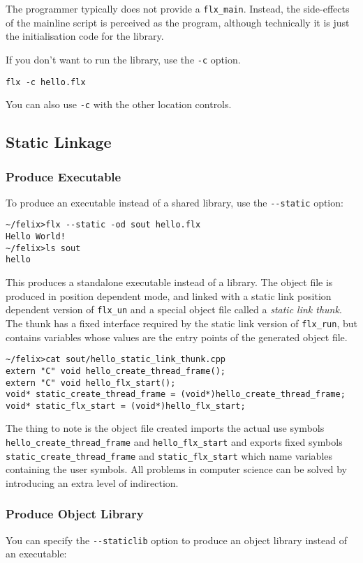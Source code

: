 \documentclass[oneside]{book}
\begin{document}
The programmer typically does not provide a \verb$flx_main$. 
Instead, the side-effects of the mainline script 
is perceived as the program, although technically it is just
the initialisation code for the library.

If you don't want to run the library, use the \verb$-c$ option.
\begin{verbatim}
flx -c hello.flx
\end{verbatim}
You can also use \verb$-c$ with the other location controls.

\subsection{Static Linkage}
\subsubsection{Produce Executable}
To produce an executable instead of a shared library,
use the \verb$--static$ option:

\begin{verbatim}
~/felix>flx --static -od sout hello.flx
Hello World!
~/felix>ls sout
hello
\end{verbatim}

This produces a standalone executable instead of a library.
The object file is produced in position dependent mode,
and linked with a static link position dependent version
of \verb$flx_un$ and a special object file called
a {\em static link thunk}. The thunk has a fixed interface
required by the static link version of \verb$flx_run$,
but contains variables whose values are the entry points of the
generated object file.

\begin{verbatim}
~/felix>cat sout/hello_static_link_thunk.cpp
extern "C" void hello_create_thread_frame();
extern "C" void hello_flx_start();
void* static_create_thread_frame = (void*)hello_create_thread_frame;
void* static_flx_start = (void*)hello_flx_start;
\end{verbatim}

The thing to note is the object file created imports the actual
use symbols \verb$hello_create_thread_frame$ and \verb$hello_flx_start$
and exports fixed symbols \verb$static_create_thread_frame$ and
\verb$static_flx_start$ which name variables containing
the user symbols. All problems in computer science can be
solved by introducing an extra level of indirection.

\subsubsection{Produce Object Library}
You can specify the \verb$--staticlib$ option to produce an 
object library instead of an executable:
\end{document}
